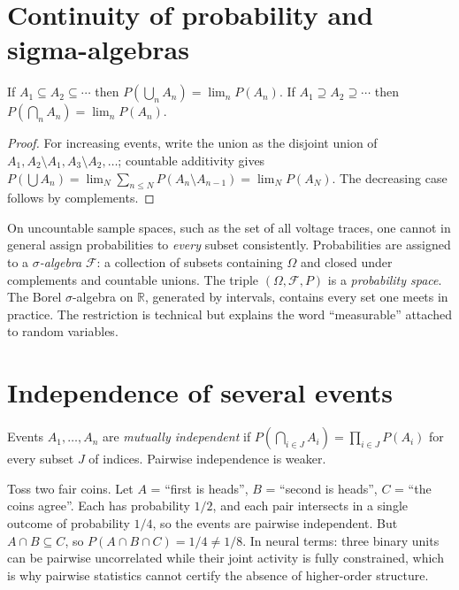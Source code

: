 \section{Continuity of probability and sigma-algebras}
\begin{proposition}
If $A_1\subseteq A_2\subseteq\cdots$ then $P(\bigcup_nA_n)=\lim_nP(A_n)$. If $A_1\supseteq A_2\supseteq\cdots$ then $P(\bigcap_nA_n)=\lim_nP(A_n)$.
\end{proposition}
\begin{proof}
For increasing events, write the union as the disjoint union of $A_1,A_2\setminus A_1,A_3\setminus A_2,\ldots$; countable additivity gives $P(\bigcup A_n)=\lim_N\sum_{n\le N}P(A_n\setminus A_{n-1})=\lim_NP(A_N)$. The decreasing case follows by complements.
\end{proof}
On uncountable sample spaces, such as the set of all voltage traces, one cannot in general assign probabilities to \emph{every} subset consistently. Probabilities are assigned to a \emph{$\sigma$-algebra} $\mathcal F$: a collection of subsets containing $\Omega$ and closed under complements and countable unions. The triple $(\Omega,\mathcal F,P)$ is a \emph{probability space}. The Borel $\sigma$-algebra on $\mathbb R$, generated by intervals, contains every set one meets in practice. The restriction is technical but explains the word ``measurable'' attached to random variables.

\section{Independence of several events}
Events $A_1,\ldots,A_n$ are \emph{mutually independent} if $P(\bigcap_{i\in J}A_i)=\prod_{i\in J}P(A_i)$ for every subset $J$ of indices. Pairwise independence is weaker.

\begin{workedexample}
Toss two fair coins. Let $A$ = ``first is heads'', $B$ = ``second is heads'', $C$ = ``the coins agree''. Each has probability $1/2$, and each pair intersects in a single outcome of probability $1/4$, so the events are pairwise independent. But $A\cap B\subseteq C$, so $P(A\cap B\cap C)=1/4\ne1/8$. In neural terms: three binary units can be pairwise uncorrelated while their joint activity is fully constrained, which is why pairwise statistics cannot certify the absence of higher-order structure.
\end{workedexample}

